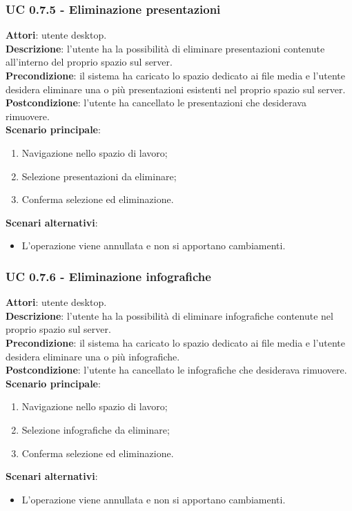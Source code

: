 	\subsubsection{UC 0.7.5 - Eliminazione presentazioni}{
		\label{uc0.7.5}
		\textbf{Attori}: utente desktop.	\\
		\textbf{Descrizione}: l'utente ha la possibilità di eliminare presentazioni contenute all'interno del proprio spazio sul server. \\
		\textbf{Precondizione}: il sistema ha caricato lo spazio dedicato ai file media e l'utente desidera eliminare una o più presentazioni esistenti nel proprio spazio sul server.	\\
		\textbf{Postcondizione}: l'utente ha cancellato le presentazioni che desiderava rimuovere.	\\
		\textbf{Scenario principale}:
		\begin{enumerate}
			\item Navigazione nello spazio di lavoro;
			\item Selezione presentazioni da eliminare;
			\item Conferma selezione ed eliminazione.
		\end{enumerate}
		\textbf{Scenari alternativi}: 
		\begin{itemize}
			\item L'operazione viene annullata e non si apportano cambiamenti.
		\end{itemize}
		}
	\subsubsection{UC 0.7.6 - Eliminazione infografiche}{
		\label{uc0.7.6}
		\textbf{Attori}: utente desktop.	\\
		\textbf{Descrizione}: l'utente ha la possibilità di eliminare infografiche contenute nel proprio spazio sul server. \\
		\textbf{Precondizione}: il sistema ha caricato lo spazio dedicato ai file media e l'utente desidera eliminare una o più infografiche.	\\
		\textbf{Postcondizione}: l'utente ha cancellato le infografiche che desiderava rimuovere.	\\
		\textbf{Scenario principale}:
		\begin{enumerate}
			\item Navigazione nello spazio di lavoro;
			\item Selezione infografiche da eliminare;
			\item Conferma selezione ed eliminazione.
		\end{enumerate}
		\textbf{Scenari alternativi}: 
		\begin{itemize}
			\item L'operazione viene annullata e non si apportano cambiamenti.
		\end{itemize}
		}
